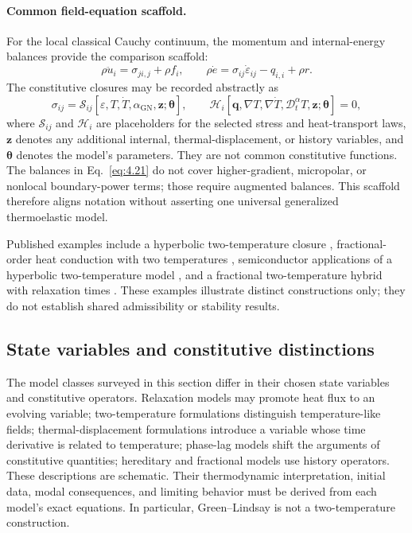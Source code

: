 \paragraph{Common field-equation scaffold.}
For the local classical Cauchy continuum, the momentum and internal-energy balances provide the comparison scaffold:
\begin{equation}
\rho\ddot{u}_i=\sigma_{ji,j}+\rho f_i,
\qquad
\rho\dot e=\sigma_{ij}\dot\varepsilon_{ij}-q_{i,i}+\rho r.
\label{eq:4.21}
\end{equation}
The constitutive closures may be recorded abstractly as
\begin{equation}
\sigma_{ij}=\mathcal{S}_{ij}[\varepsilon,T,\dot T,\alpha_{\mathrm{GN}},\bm z;\bm\theta],
\qquad
\mathcal{H}_i[\bm q,\nabla T,\nabla\dot T,\mathcal{D}_t^\alpha T,\bm z;\bm\theta]=0,
\label{eq:4.22}
\end{equation}
where $\mathcal{S}_{ij}$ and $\mathcal{H}_i$ are placeholders for the selected stress and heat-transport laws, $\bm z$ denotes any additional internal, thermal-displacement, or history variables, and $\bm\theta$ denotes the model's parameters. They are not common constitutive functions. The balances in Eq.~\eqref{eq:4.21} do not cover higher-gradient, micropolar, or nonlocal boundary-power terms; those require augmented balances. This scaffold therefore aligns notation without asserting one universal generalized thermoelastic model.





Published examples include a hyperbolic two-temperature closure \cite{Prasad2020}, fractional-order heat conduction with two temperatures \cite{Ezzat2011}, semiconductor applications of a hyperbolic two-temperature model \cite{Alzahrani2020}, and a fractional two-temperature hybrid with relaxation times \cite{Bassiouny2020}. These examples illustrate distinct constructions only; they do not establish shared admissibility or stability results.

\subsection{State variables and constitutive distinctions}
\label{sec:4.13}

The model classes surveyed in this section differ in their chosen state variables and constitutive operators. Relaxation models may promote heat flux to an evolving variable; two-temperature formulations distinguish temperature-like fields; thermal-displacement formulations introduce a variable whose time derivative is related to temperature; phase-lag models shift the arguments of constitutive quantities; hereditary and fractional models use history operators. These descriptions are schematic. Their thermodynamic interpretation, initial data, modal consequences, and limiting behavior must be derived from each model's exact equations. In particular, Green--Lindsay is not a two-temperature construction.

